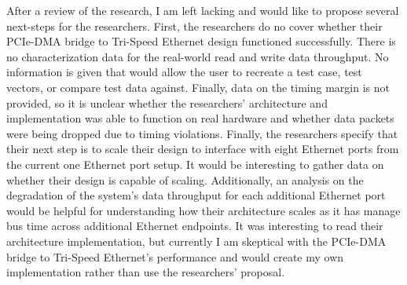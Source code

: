 \documentclass{article}
\begin{document}
After a review of the research, I am left lacking and would like to propose several next-steps for the researchers. First, the researchers do no cover whether their PCIe-DMA bridge to Tri-Speed Ethernet design functioned successfully. There is no characterization data for the real-world read and write data throughput. No information is given that would allow the user to recreate a test case, test vectors, or compare test data against. Finally, data on the timing margin is not provided, so it is unclear whether the researchers' architecture and implementation was able to function on real hardware and whether data packets were being dropped due to timing violations. Finally, the researchers specify that their next step is to scale their design to interface with eight Ethernet ports from the current one Ethernet port setup. It would be interesting to gather data on whether their design is capable of scaling. Additionally, an analysis on the degradation of the system's data throughput for each additional Ethernet port would be helpful for understanding how their architecture scales as it has manage bus time across additional Ethernet endpoints. It was interesting to read their architecture implementation, but currently I am skeptical with the PCIe-DMA bridge to Tri-Speed Ethernet's performance and would create my own implementation rather than use the researchers' proposal. 

\nocite{*}



\end{document}
